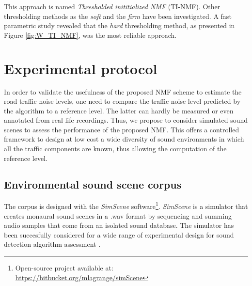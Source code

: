 \documentclass[twocolumn]{svjour3}          %
\begin{document}
This approach is named \textit{Thresholded inititialized NMF} (TI-NMF). Other thresholding methods as the \textit{soft} \cite{donoho1995noising} and the \textit{firm} \cite{fornasier2008iterative} have been investigated. A fast parametric study revealed that the \textit{hard} thresholding method, as presented in  Figure \ref{fig:W_TI_NMF}, was the most reliable approach.

\section{Experimental protocol}\label{part:protocol}

In order to validate the usefulness of the proposed NMF scheme to estimate the road traffic noise levels, one need to compare the traffic noise level predicted by the algorithm to a reference level. The latter can hardly be measured or even annotated from real life recordings. Thus,  we propose to consider simulated sound scenes to assess the performance of the proposed NMF. This offers a controlled framework to design at low cost a wide diversity of sound environments in which all the traffic components are known, thus allowing the computation of the reference level.

\subsection{Environmental sound scene corpus}

The corpus is designed with the \textit{SimScene} software\footnote{Open-source project available at: \url{https://bitbucket.org/mlagrange/simScene}}. \textit{SimScene} \cite{rossignol_simscene:_2015} is a simulator that creates monaural sound scenes in a .wav format by sequencing and summing audio samples that come from an isolated sound database. The simulator has been succesfully considered for a wide range of experimental design for sound detection algorithm assessment \cite{lafay:hal-01111381} \cite{benetos:hal-01520194} \cite{mesaros:hal-01650601}.
\end{document}
